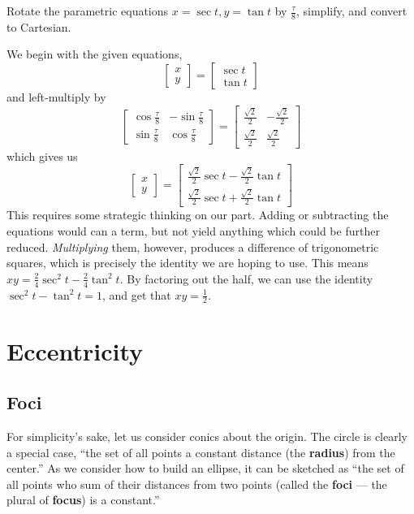 \begin{example}
\exProblem
Rotate the parametric equations $x=\sec{t}, y=\tan{t}$ by $\frac{\tau}{8}$, simplify, and convert to
Cartesian.

\exSolution
We begin with the given equations, 
$$
\begin{bmatrix} x \\ y \end{bmatrix}
=
\begin{bmatrix} \sec{t} \\ \tan{t} \end{bmatrix}
$$
and left-multiply by
$$
\begin{bmatrix} \cos\frac{\tau}{8} & -\sin\frac{\tau}{8} \\
\sin\frac{\tau}{8} & \cos\frac{\tau}{8} \end{bmatrix}
=
\begin{bmatrix} \frac{\sqrt{2}}{2} & -\frac{\sqrt{2}}{2} \\
\frac{\sqrt{2}}{2} & \frac{\sqrt{2}}{2} \end{bmatrix}
$$
which gives us 
$$
\begin{bmatrix} x \\ y \end{bmatrix}
=
\begin{bmatrix}
\frac{\sqrt{2}}{2}\sec{t} - \frac{\sqrt{2}}{2}\tan{t} \\
\frac{\sqrt{2}}{2}\sec{t} + \frac{\sqrt{2}}{2}\tan{t}
\end{bmatrix}
$$
This requires some strategic thinking on our part.  Adding or subtracting the equations would can
a term, but not yield anything which could be further reduced.  \emph{Multiplying} them, however,
produces a difference of trigonometric squares, which is precisely the identity we are hoping to use.
This means $xy = \frac{2}{4}\sec^2{t} - \frac{2}{4}\tan^2{t}$.  By factoring out the half, we can use
the identity $\sec^2{t}-\tan^2{t}=1$, and get that $xy=\frac{1}{2}$.
\end{example}


\newpage
\section{Eccentricity}
\subsection{Foci}
For simplicity's sake, let us consider conics about the origin.  The circle is clearly a special case,
``the set of all points a constant distance (the \textbf{radius}) from the center.''  As we consider how to 
build an ellipse, it can be sketched as ``the set of all points who sum of their distances from 
two points (called the \textbf{foci} --- the plural of \textbf{focus}) is a constant.''

